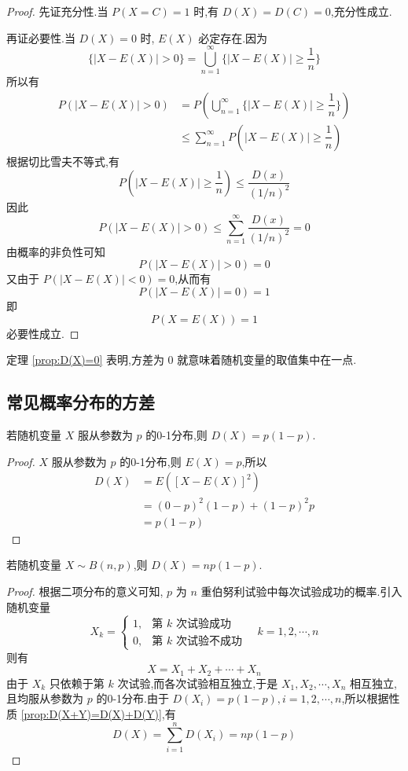 \begin{proof}
    先证充分性.当 $P(X=C)=1$ 时,有 $D(X)=D(C)=0$,充分性成立.

    再证必要性.当 $D(X)=0$ 时, $E(X)$ 必定存在.因为
    $$
    \{ |X-E(X)|>0 \} = \bigcup_{n=1}^{\infty} \{ |X-E(X)| \geqslant \dfrac{1}{n} \}
    $$
    所以有
    $$
    \begin{aligned}
        P(|X-E(X)|>0) &= P \left( \bigcup_{n=1}^{\infty} \{ |X-E(X)| \geqslant \dfrac{1}{n} \} \right) \\
        & \leqslant \sum_{n=1}^{\infty} P(|X-E(X)| \geqslant \dfrac{1}{n})
    \end{aligned}
    $$
    根据切比雪夫不等式,有
    $$
    P(|X-E(X)| \geqslant \dfrac{1}{n}) \leqslant \dfrac{D(x)}{(1/n)^2}
    $$
    因此
    $$
    P(|X-E(X)|>0) \leqslant \sum_{n=1}^{\infty} \dfrac{D(x)}{(1/n)^2} = 0
    $$
    由概率的非负性可知
    $$
    P(|X-E(X)|>0) = 0
    $$
    又由于 $P(|X-E(X)|<0) = 0$,从而有
    $$
    P(|X-E(X)|=0) = 1
    $$
    即
    $$
    P(X=E(X)) = 1
    $$
    必要性成立.
\end{proof}

定理 \ref{prop:D(X)=0} 表明,方差为 $0$ 就意味着随机变量的取值集中在一点.

\subsection{常见概率分布的方差}

\begin{conclusion}
    \indent 若随机变量 $X$ 服从参数为 $p$ 的0-1分布,则 $D(X) = p(1-p)$.
\end{conclusion}

\begin{proof}
    $X$ 服从参数为 $p$ 的0-1分布,则 $E(X)=p$,所以
    $$
    \begin{aligned}
        D(X) &= E([X-E(X)]^2) \\
        &= (0-p)^2 (1-p) + (1-p)^2 p \\
        &= p(1-p)
    \end{aligned}
    $$

    \vspace{-1.3em}
\end{proof}

\begin{conclusion}
    \indent 若随机变量 $X \sim B(n,p)$,则 $D(X) = np(1-p)$.
\end{conclusion}

\begin{proof}
    根据二项分布的意义可知, $p$ 为 $n$ 重伯努利试验中每次试验成功的概率.引入随机变量
    $$
    X_k = \begin{cases}
        1, & \text{第 $k$ 次试验成功} \\
        0, & \text{第 $k$ 次试验不成功}
    \end{cases} \quad k=1,2,\cdots,n
    $$
    则有
    $$
    X = X_1 + X_2 + \cdots + X_n
    $$
    由于 $X_k$ 只依赖于第 $k$ 次试验,而各次试验相互独立,于是 $X_1, X_2, \cdots, X_n$ 相互独立,且均服从参数为 $p$ 的0-1分布.由于 $D(X_i) = p(1-p), i=1,2,\cdots,n$,所以根据性质 \ref{prop:D(X+Y)=D(X)+D(Y)},有
    $$
    D(X) = \sum_{i=1}^n D(X_i) = np(1-p)
    $$
\end{proof}


